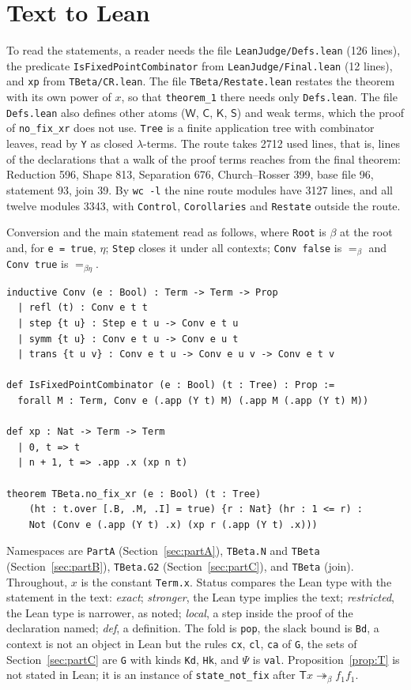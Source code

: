 \documentclass[a4paper,english]{lipics-v2021}
\newcommand{\Cc}{\mathsf{C}}
\newcommand{\W}{\mathsf{W}}
\newcommand{\T}{\mathsf{T}}
\newcommand{\breds}{\twoheadrightarrow_{\beta}}
\newcommand{\eqb}{=_{\beta}}
\newcommand{\eqbe}{=_{\beta\eta}}
\newcommand{\lean}[1]{\texttt{#1}}
\begin{document}
\appendix
\section{Text to Lean}\label{app:table}

To read the statements, a reader needs the file \lean{LeanJudge/Defs.lean} (126 lines), the predicate \lean{IsFixedPoint\-Combinator} from \lean{LeanJudge/Final.lean} (12 lines), and \lean{xp} from \lean{TBeta/CR.lean}. The file \lean{TBeta/Restate.lean} restates the theorem with its own power of $x$, so that \lean{theorem\_1} there needs only \lean{Defs.lean}. The file \lean{Defs.lean} also defines other atoms ($\W$, $\Cc$, $\mathsf{K}$, $\mathsf{S}$) and weak terms, which the proof of \lean{no\_fix\_xr} does not use. \lean{Tree} is a finite application tree with combinator leaves, read by \lean{Y} as closed $\lambda$-terms. The route takes 2712 used lines, that is, lines of the declarations that a walk of the proof terms reaches from the final theorem: Reduction 596, Shape 813, Separation 676, Church--Rosser 399, base file 96, statement 93, join 39. By \lean{wc -l} the nine route modules have 3127 lines, and all twelve modules 3343, with \lean{Control}, \lean{Corollaries} and \lean{Restate} outside the route.

Conversion and the main statement read as follows, where \lean{Root} is $\beta$ at the root and, for \lean{e = true}, $\eta$; \lean{Step} closes it under all contexts; \lean{Conv false} is $\eqb$ and \lean{Conv true} is $\eqbe$.
{\small
\begin{verbatim}
inductive Conv (e : Bool) : Term -> Term -> Prop
  | refl (t) : Conv e t t
  | step {t u} : Step e t u -> Conv e t u
  | symm {t u} : Conv e t u -> Conv e u t
  | trans {t u v} : Conv e t u -> Conv e u v -> Conv e t v

def IsFixedPointCombinator (e : Bool) (t : Tree) : Prop :=
  forall M : Term, Conv e (.app (Y t) M) (.app M (.app (Y t) M))

def xp : Nat -> Term -> Term
  | 0, t => t
  | n + 1, t => .app .x (xp n t)

theorem TBeta.no_fix_xr (e : Bool) (t : Tree)
    (ht : t.over [.B, .M, .I] = true) {r : Nat} (hr : 1 <= r) :
    Not (Conv e (.app (Y t) .x) (xp r (.app (Y t) .x)))
\end{verbatim}
}

Namespaces are \lean{PartA} (Section~\ref{sec:partA}), \lean{TBeta.N} and \lean{TBeta} (Section~\ref{sec:partB}), \lean{TBeta.G2} (Section~\ref{sec:partC}), and \lean{TBeta} (join). Throughout, $x$ is the constant \lean{Term.x}. Status compares the Lean type with the statement in the text: \emph{exact}; \emph{stronger}, the Lean type implies the text; \emph{restricted}, the Lean type is narrower, as noted; \emph{local}, a step inside the proof of the declaration named; \emph{def}, a definition. The fold is \lean{pop}, the slack bound is \lean{Bd}, a context is not an object in Lean but the rules \lean{cx}, \lean{cl}, \lean{ca} of \lean{G}, the sets of Section~\ref{sec:partC} are \lean{G} with kinds \lean{Kd}, \lean{Hk}, and $\Psi$ is \lean{val}. Proposition~\ref{prop:T} is not stated in Lean; it is an instance of \lean{state\_not\_fix} after $\T x \breds f_1f_1$.
\end{document}

